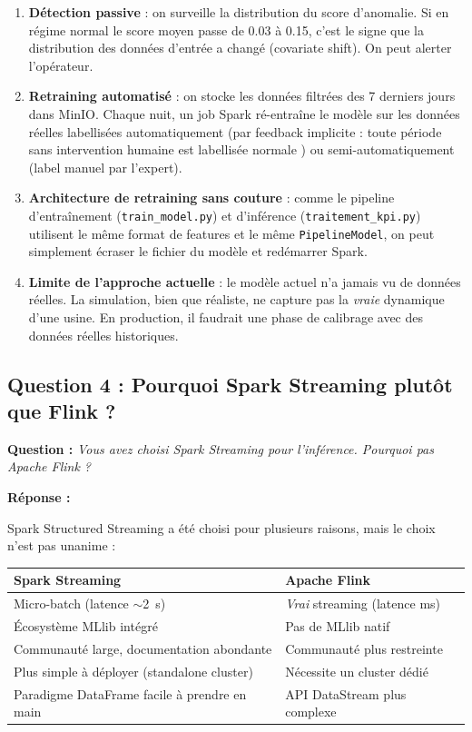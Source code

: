 \documentclass[11pt,a4paper]{article}
\begin{document}
\begin{enumerate}
    \item \textbf{Détection passive} : on surveille la distribution du score d'anomalie. Si en régime normal le score moyen passe de 0.03 à 0.15, c'est le signe que la distribution des données d'entrée a changé (covariate shift). On peut alerter l'opérateur.

    \item \textbf{Retraining automatisé} : on stocke les données filtrées des 7 derniers jours dans MinIO. Chaque nuit, un job Spark ré-entraîne le modèle sur les données réelles labellisées automatiquement (par feedback implicite : toute période sans intervention humaine est labellisée \og normale \fg{}) ou semi-automatiquement (label manuel par l'expert).

    \item \textbf{Architecture de retraining sans couture} : comme le pipeline d'entraînement (\texttt{train\_model.py}) et d'inférence (\texttt{traitement\_kpi.py}) utilisent le même format de features et le même \texttt{PipelineModel}, on peut simplement écraser le fichier du modèle et redémarrer Spark.

    \item \textbf{Limite de l'approche actuelle} : le modèle actuel n'a jamais vu de données réelles. La simulation, bien que réaliste, ne capture pas la \emph{vraie} dynamique d'une usine. En production, il faudrait une phase de calibrage avec des données réelles historiques.
\end{enumerate}

\subsection{Question 4 : Pourquoi Spark Streaming plutôt que Flink ?}

\textbf{Question :} \textit{Vous avez choisi Spark Streaming pour l'inférence. Pourquoi pas Apache Flink ?}

\textbf{Réponse :}

Spark Structured Streaming a été choisi pour plusieurs raisons, mais le choix n'est pas unanime :

\begin{center}
\small
\begin{tabularx}{\textwidth}{|X|X|}
\hline
\textbf{Spark Streaming} & \textbf{Apache Flink} \\
\hline
Micro-batch (latence $\sim$2~s) & \emph{Vrai} streaming (latence ms) \\
Écosystème MLlib intégré & Pas de MLlib natif \\
Communauté large, documentation abondante & Communauté plus restreinte \\
Plus simple à déployer (standalone cluster) & Nécessite un cluster dédié \\
Paradigme DataFrame facile à prendre en main & API DataStream plus complexe \\
\hline
\end{tabularx}
\end{center}
\end{document}
